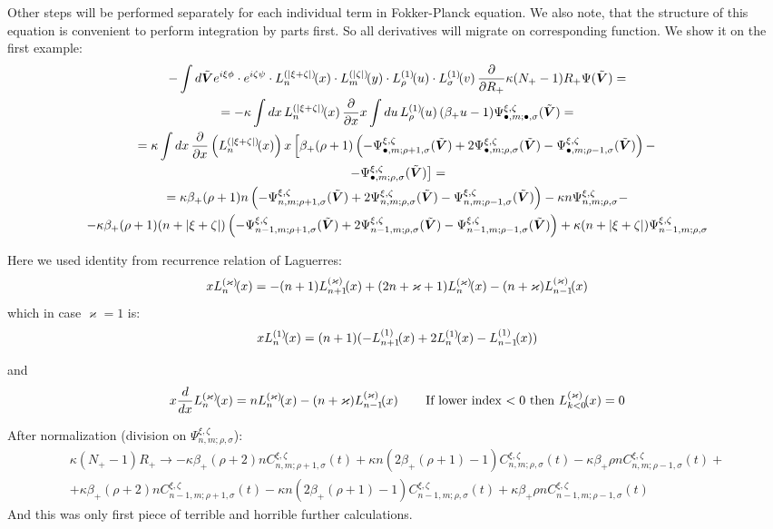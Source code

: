\documentclass[12pt, notitlepage]{report}
\begin{document}
Other steps will be performed separately for each individual term in Fokker-Planck equation. We also note, that the structure of this equation is convenient to perform integration by parts first. So all derivatives will migrate on corresponding function. We show it on the first example:
\begin{multline}
	-\int d\tbV e^{i\xi \phi} \cdot e^{i\zeta \psi} \cdot  \Lagg{n}{|\xi+\zeta|}{x} \cdot \Lagg{m}{|\zeta|}{y} \cdot
	\Lagg{\rho}{1}{u} \cdot \Lagg{\sigma}{1}{v} \frac{\partial}{\partial R_+} \kappa (N_+ - 1) R_+ \Psi(\tbV) =\\
	= -\kappa\int dx\,\Lagg{n}{|\xi+\zeta|}{x}\frac{\partial}{\partial x} x  \int du\, \Lagg{\rho}{1}{u} (\beta_+ u - 1)  \Psi^{\xi,\zeta}_{\bullet,m;\bullet,\sigma}(\tbV) =\\
	= \kappa\int dx\,\frac{\partial}{\partial x}\left(\Lagg{n}{|\xi+\zeta|}{x}\right) x \left[ \beta_+(\rho + 1)\left(-\Psi^{\xi,\zeta}_{\bullet,m;\rho+1,\sigma}(\tbV) + 2\Psi^{\xi,\zeta}_{\bullet,m;\rho,\sigma}(\tbV) -\Psi^{\xi,\zeta}_{\bullet,m;\rho-1,\sigma}(\tbV)\right) - \right.\\
	\left.- \Psi^{\xi,\zeta}_{\bullet,m;\rho,\sigma}(\tbV)\right] = \\=
	\kappa\beta_+(\rho+1) n \left(-\Psi^{\xi,\zeta}_{n,m;\rho+1,\sigma}(\tbV) + 2\Psi^{\xi,\zeta}_{n,m;\rho,\sigma}(\tbV) -\Psi^{\xi,\zeta}_{n,m;\rho-1,\sigma}(\tbV)\right) - \kappa n \Psi^{\xi,\zeta}_{n,m;\rho,\sigma} -\\- \kappa\beta_+(\rho+1)(n+|\xi+\zeta|) \left(-\Psi^{\xi,\zeta}_{n-1,m;\rho+1,\sigma}(\tbV) + 2\Psi^{\xi,\zeta}_{n-1,m;\rho,\sigma}(\tbV) -\Psi^{\xi,\zeta}_{n-1,m;\rho-1,\sigma}(\tbV)\right) + \kappa (n+|\xi+\zeta|) \Psi^{\xi,\zeta}_{n-1,m;\rho,\sigma}
\end{multline}

Here we used identity from recurrence relation of Laguerres:
$$
x \Lagg{n}{\varkappa}{x} = -(n+1)\Lagg{n+1}{\varkappa}{x} + (2n+\varkappa+1)\Lagg{n}{\varkappa}{x} - (n+\varkappa)\Lagg{n-1}{\varkappa}{x}
$$
which in case $\varkappa = 1$ is:
$$
x \Lagg{n}{1}{x} = (n+1)(-\Lagg{n+1}{1}{x} + 2\Lagg{n}{1}{x} - \Lagg{n-1}{1}{x})
$$

and
$$
x\frac{d}{dx}\Lagg{n}{\varkappa}{x} = n\Lagg{n}{\varkappa}{x} - (n+\varkappa)\Lagg{n-1}{\varkappa}{x} \qquad \text{If lower index $<0$ then } \Lagg{k<0}{\varkappa}{x} = 0
$$

After normalization (division on $\Psi^{\xi,\zeta}_{n,m;\rho,\sigma}$):
\begin{multline}
	\kappa(N_+ -1)R_+ \rightarrow 
	-\kappa\beta_+(\rho+2)n C^{\xi, \zeta}_{n,m; \rho+1, \sigma}(t) + \kappa n(2\beta_+(\rho+1) - 1)C^{\xi, \zeta}_{n,m; \rho, \sigma}(t) - \kappa\beta_+\rho n C^{\xi, \zeta}_{n,m; \rho-1, \sigma}(t) + \\
	+ \kappa\beta_+(\rho+2)nC^{\xi, \zeta}_{n-1,m; \rho+1, \sigma}(t) - \kappa n(2\beta_+(\rho+1) - 1) C^{\xi, \zeta}_{n-1,m; \rho, \sigma}(t) + \kappa\beta_+\rho n C^{\xi, \zeta}_{n-1,m; \rho-1, \sigma}(t)
\end{multline}
And this was only first piece of terrible and horrible further calculations.
\end{document}
